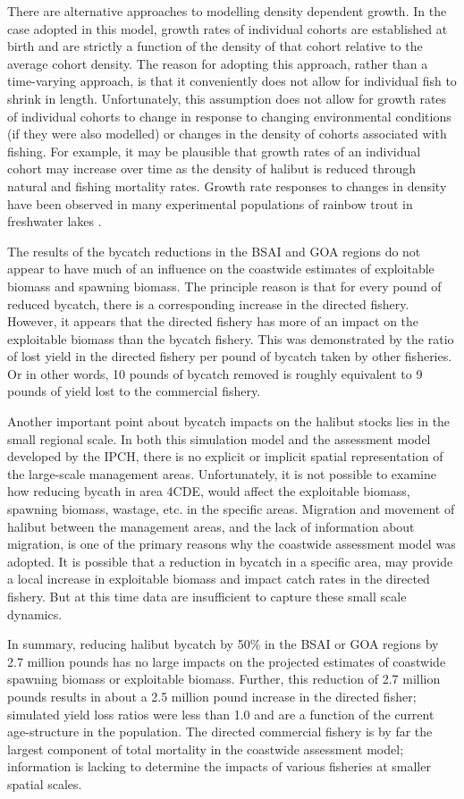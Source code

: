 There are alternative approaches to modelling density dependent growth.  In the case adopted in this model, growth rates of individual cohorts are established at birth and are strictly a function of the density of that cohort relative to the average cohort density.  The reason for adopting this approach, rather than a time-varying approach, is that it conveniently does not allow for individual fish to shrink in length.  Unfortunately, this assumption does not allow for growth rates of individual cohorts to change in response to changing environmental conditions (if they were also modelled) or changes in the density of cohorts associated with fishing.  For example, it may be plausible that growth rates of an individual cohort may increase over time as the density of halibut is reduced through natural and fishing mortality rates.  Growth rate responses to changes in density have been observed in many experimental populations of rainbow trout in freshwater lakes \citep{post1999density}. 

The results of the bycatch reductions in the BSAI and GOA regions do not appear to have much of an influence on the coastwide estimates of exploitable biomass and spawning biomass.  The principle reason is that for every pound of reduced bycatch, there is a corresponding increase in the directed fishery.  However, it appears that the directed fishery has more of an impact on the exploitable biomass than the bycatch fishery.  This was demonstrated by the ratio of lost yield in the directed fishery per pound of bycatch taken by other fisheries.  Or in other words, 10 pounds of bycatch removed is roughly equivalent to 9 pounds of yield lost to the commercial fishery. 

Another important point about bycatch impacts on the halibut stocks lies in the small regional scale.  In both this simulation model and the assessment model developed by the IPCH, there is no explicit  or implicit spatial representation of the large-scale management areas.  Unfortunately, it is not possible to examine how reducing bycath in area 4CDE, would affect the exploitable biomass, spawning biomass, wastage, etc.  in the specific areas.  Migration and movement of halibut between the management areas, and the lack of information about migration,  is one of the primary reasons why the coastwide assessment model was adopted.  It is possible that a reduction in bycatch in a specific area, may provide a local increase in exploitable biomass and impact catch rates in the directed fishery.  But at this time data are insufficient to capture these small scale dynamics.

In summary, reducing halibut bycatch by 50\% in the BSAI or GOA regions by 2.7 million pounds has no large impacts on the projected estimates of coastwide spawning biomass or exploitable biomass.  Further, this reduction of 2.7 million pounds results in about a 2.5 million pound increase in the directed fisher; simulated yield loss ratios were less than 1.0 and are a function of the current age-structure in the population.  The directed commercial fishery is by far the largest component of total mortality in the coastwide assessment model; information is lacking to determine the impacts of various fisheries at smaller spatial scales.

